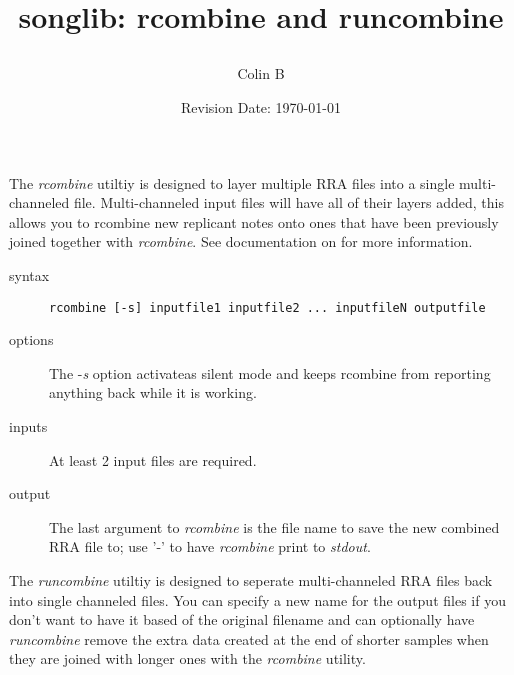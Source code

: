 \documentclass{article}
\title{songlib: rcombine and runcombine\\
\date{Revision Date: \today}}
\author{Colin B}
\begin{document}
\maketitle

\W\subsubsection*{}
\W\htmlrule

The {\it rcombine} utiltiy is designed to layer multiple RRA files into a single
multi-channeled file.  Multi-channeled input files will have all of their 
layers added, this allows you to rcombine new replicant notes onto ones
that have been previously joined together with {\it rcombine}.
See documentation
on
 for more information.

\begin{description}

\item[syntax]

\begin{verbatim}
rcombine [-s] inputfile1 inputfile2 ... inputfileN outputfile
\end{verbatim}

\item[options]

The -{\it s}
option activateas silent mode and keeps rcombine from reporting anything back
while it is working.

\item[inputs]

At least 2 input files are required.

\item[output]

The last argument to {\it rcombine} is the file name
to save the new combined RRA file to;
use '-' to have {\it rcombine} print to {\it stdout}.

\end{description}

The {\it runcombine} utiltiy is designed to seperate multi-channeled RRA files 
back into single channeled files.  You can specify a new name for the
output files if you don't want to have it based of the original filename
and can optionally have {\it runcombine} remove the extra data created at the
end of shorter samples when they are joined with longer ones with the
{\it rcombine} utility.
\end{document}
